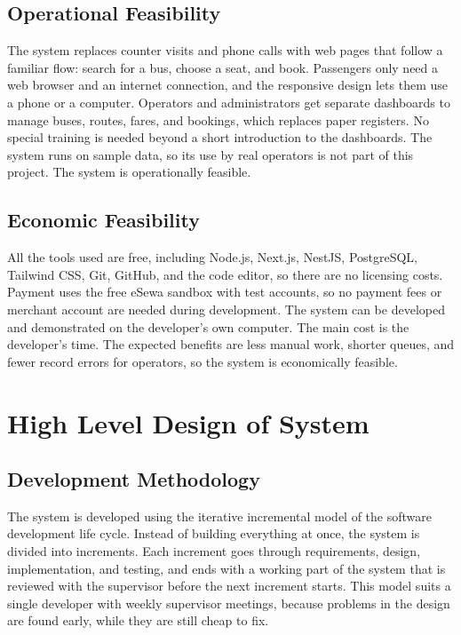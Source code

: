 \subsection{Operational Feasibility}

The system replaces counter visits and phone calls with web pages that follow a familiar flow: search for a bus, choose a seat, and book. Passengers only need a web browser and an internet connection, and the responsive design lets them use a phone or a computer. Operators and administrators get separate dashboards to manage buses, routes, fares, and bookings, which replaces paper registers. No special training is needed beyond a short introduction to the dashboards. The system runs on sample data, so its use by real operators is not part of this project. The system is operationally feasible.

\subsection{Economic Feasibility}

All the tools used are free, including Node.js, Next.js, NestJS, PostgreSQL, Tailwind CSS, Git, GitHub, and the code editor, so there are no licensing costs. Payment uses the free eSewa sandbox with test accounts, so no payment fees or merchant account are needed during development. The system can be developed and demonstrated on the developer's own computer. The main cost is the developer's time. The expected benefits are less manual work, shorter queues, and fewer record errors for operators, so the system is economically feasible.

\section{High Level Design of System}

\subsection{Development Methodology}

The system is developed using the iterative incremental model of the software development life cycle. Instead of building everything at once, the system is divided into increments. Each increment goes through requirements, design, implementation, and testing, and ends with a working part of the system that is reviewed with the supervisor before the next increment starts. This model suits a single developer with weekly supervisor meetings, because problems in the design are found early, while they are still cheap to fix.

